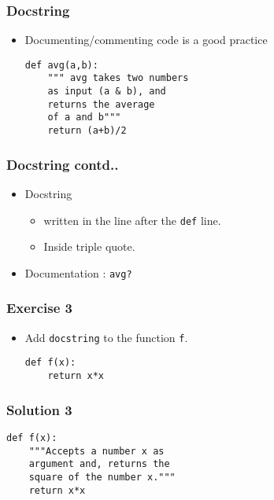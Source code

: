 \documentclass[17pt,compress]{beamer}
\begin{document}
\begin{frame}[fragile]
\frametitle{Docstring}
\label{sec-8.1}

\begin{itemize}
\item Documenting/commenting code is a good practice\pause
\lstset{language=Python}
\begin{lstlisting}
def avg(a,b):
    """ avg takes two numbers
    as input (a & b), and 
    returns the average 
    of a and b"""
    return (a+b)/2
\end{lstlisting}
\end{itemize}
\end{frame}
\begin{frame}[fragile]
\frametitle{Docstring contd..}
\label{sec-8.2}

\begin{itemize}
\item Docstring
\begin{itemize}
\item written in the line after the \texttt{def} line.\pause
\item Inside triple quote.\pause
\end{itemize}
\item Documentation :  
     \texttt{avg?}
\end{itemize}
\end{frame}
\begin{frame}[fragile]
\frametitle{Exercise 3}
\label{sec-9}
\begin{itemize}
\item Add \texttt{docstring} to the function \texttt{f}.

\lstset{language=Python}
\begin{lstlisting}
def f(x):
    return x*x
\end{lstlisting}
\end{itemize}
\end{frame}
\begin{frame}[fragile]
\frametitle{Solution 3}
\label{sec-10}

\lstset{language=Python}
\begin{lstlisting}
def f(x):
    """Accepts a number x as 
    argument and, returns the
    square of the number x."""
    return x*x
\end{lstlisting}
\end{frame}
\end{document}

